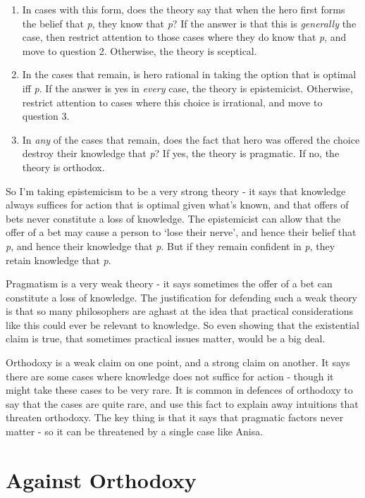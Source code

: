 \documentclass[
  12pt,
  letterpaper,
]{scrbook}
\providecommand{\tightlist}{%
  \setlength{\itemsep}{0pt}\setlength{\parskip}{0pt}}\usepackage{longtable,booktabs,array}
\begin{document}
\begin{enumerate}
\def\labelenumi{\arabic{enumi}.}
\tightlist
\item
  In cases with this form, does the theory say that when the hero first
  forms the belief that \emph{p}, they know that \emph{p}? If the answer
  is that this is \emph{generally} the case, then restrict attention to
  those cases where they do know that \emph{p}, and move to question 2.
  Otherwise, the theory is sceptical.
\item
  In the cases that remain, is hero rational in taking the option that
  is optimal iff \emph{p}. If the answer is yes in \emph{every} case,
  the theory is epistemicist. Otherwise, restrict attention to cases
  where this choice is irrational, and move to question 3.
\item
  In \emph{any} of the cases that remain, does the fact that hero was
  offered the choice destroy their knowledge that \emph{p}? If yes, the
  theory is pragmatic. If no, the theory is orthodox.
\end{enumerate}

So I'm taking epistemicism to be a very strong theory - it says that
knowledge always suffices for action that is optimal given what's known,
and that offers of bets never constitute a loss of knowledge. The
epistemicist can allow that the offer of a bet may cause a person to
`lose their nerve', and hence their belief that \emph{p}, and hence
their knowledge that \emph{p}. But if they remain confident in \emph{p},
they retain knowledge that \emph{p}.

Pragmatism is a very weak theory - it says sometimes the offer of a bet
can constitute a loss of knowledge. The justification for defending such
a weak theory is that so many philosophers are aghast at the idea that
practical considerations like this could ever be relevant to knowledge.
So even showing that the existential claim is true, that sometimes
practical issues matter, would be a big deal.

Orthodoxy is a weak claim on one point, and a strong claim on another.
It says there are some cases where knowledge does not suffice for action
- though it might take these cases to be very rare. It is common in
defences of orthodoxy to say that the cases are quite rare, and use this
fact to explain away intuitions that threaten orthodoxy. The key thing
is that it says that pragmatic factors never matter - so it can be
threatened by a single case like Anisa.

\section{Against Orthodoxy}\label{sec-orthodox}
\end{document}
